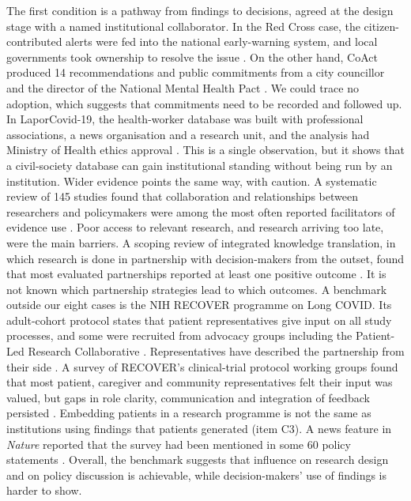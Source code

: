 \documentclass[
  number,
  preprint]{elsarticle}
\begin{document}
The first condition is a pathway from findings to decisions, agreed at
the design stage with a named institutional collaborator. In the Red
Cross case, the citizen-contributed alerts were fed into the national
early-warning system, and local governments took ownership to resolve
the issue \citep{ifrc2021}. On the other hand, CoAct produced 14
recommendations and public commitments from a city councillor and the
director of the National Mental Health Pact
\citep{ub2022assembly, bcn2023plan}. We could trace no adoption, which
suggests that commitments need to be recorded and followed up. In
LaporCovid-19, the health-worker database was built with professional
associations, a news organisation and a research unit, and the analysis
had Ministry of Health ethics approval \citep{ekawati2022}. This is a
single observation, but it shows that a civil-society database can gain
institutional standing without being run by an institution. Wider
evidence points the same way, with caution. A systematic review of 145
studies found that collaboration and relationships between researchers
and policymakers were among the most often reported facilitators of
evidence use \citep{oliver2014}. Poor access to relevant research, and
research arriving too late, were the main barriers. A scoping review of
integrated knowledge translation, in which research is done in
partnership with decision-makers from the outset, found that most
evaluated partnerships reported at least one positive outcome
\citep{gagliardi2016}. It is not known which partnership strategies lead
to which outcomes. A benchmark outside our eight cases is the NIH
RECOVER programme on Long COVID. Its adult-cohort protocol states that
patient representatives give input on all study processes, and some were
recruited from advocacy groups including the Patient-Led Research
Collaborative \citep{horwitz2023}. Representatives have described the
partnership from their side \citep{kim2023}. A survey of RECOVER's
clinical-trial protocol working groups found that most patient,
caregiver and community representatives felt their input was valued, but
gaps in role clarity, communication and integration of feedback
persisted \citep{leverty2026}. Embedding patients in a research
programme is not the same as institutions using findings that patients
generated (item C3). A news feature in \emph{Nature} reported that the
survey had been mentioned in some 60 policy statements
\citep{fairbank2024}. Overall, the benchmark suggests that influence on
research design and on policy discussion is achievable, while
decision-makers' use of findings is harder to show.
\end{document}
